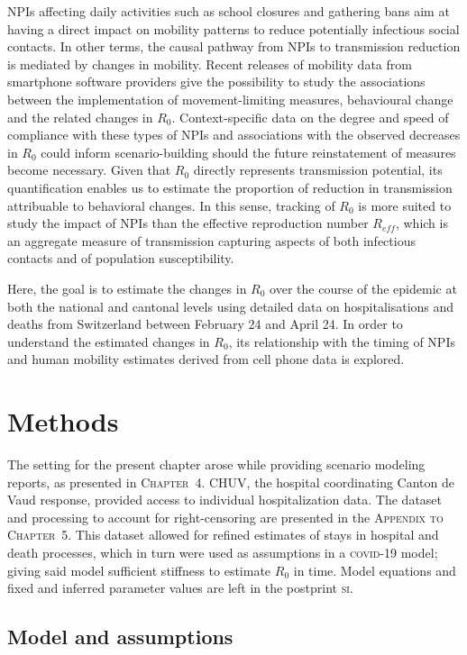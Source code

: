 NPIs affecting daily activities such as school closures and gathering bans aim at having a direct impact on mobility patterns to reduce potentially infectious social contacts. In other terms, the causal pathway from NPIs to transmission reduction is mediated by changes in mobility. Recent releases of mobility data from smartphone software providers give the possibility to study the associations between the implementation of movement-limiting measures, behavioural change and the related changes in $R_0$. Context-specific data on the degree and speed of compliance with these types of NPIs and associations with the observed decreases in $R_0$ could inform scenario-building should the future reinstatement of measures become necessary. Given that $R_0$ directly represents transmission potential, its quantification enables us to estimate the proportion of reduction in transmission attribuable to behavioral changes. In this sense, tracking of $R_0$ is more suited to study the impact of NPIs than the effective reproduction number $R_{eff}$, which is an aggregate measure of transmission capturing aspects of both infectious contacts and of population susceptibility. 

Here, the goal is to estimate the changes in $R_0$ over the course of the epidemic at both the national and cantonal levels using detailed data on hospitalisations and deaths from Switzerland between February 24 and April 24. In order to understand the estimated changes in $R_0$, its relationship with the timing of NPIs and human mobility estimates derived from cell phone data is explored.

\section{Methods}
The setting for the present chapter arose while providing scenario modeling reports, as presented in \textsc{Chapter~4}. CHUV, the hospital coordinating Canton de Vaud response, provided access to individual hospitalization data. The dataset and processing to account for right-censoring are presented in the \textsc{Appendix to Chapter~5}. This dataset allowed for refined estimates of stays in hospital and death processes, which in turn were used as assumptions in a \textsc{covid}-19 model; giving said model sufficient stiffness to estimate $R_0$ in time. Model equations and fixed and inferred parameter values are left in the postprint \textsc{si}.

\subsection{Model and assumptions}
